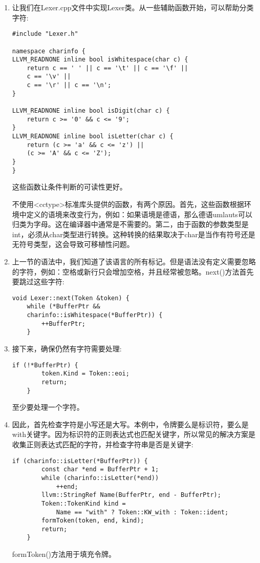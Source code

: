 \begin{enumerate}
\item 让我们在Lexer.cpp文件中实现Lexer类。从一些辅助函数开始，可以帮助分类字符:
\begin{lstlisting}[caption={}]
#include "Lexer.h"

namespace charinfo {
LLVM_READNONE inline bool isWhitespace(char c) {
	return c == ' ' || c == '\t' || c == '\f' ||
	c == '\v' ||
	c == '\r' || c == '\n';
}

LLVM_READNONE inline bool isDigit(char c) {
	return c >= '0' && c <= '9';
}
LLVM_READNONE inline bool isLetter(char c) {
	return (c >= 'a' && c <= 'z') ||
	(c >= 'A' && c <= 'Z');
}
}
\end{lstlisting}
这些函数让条件判断的可读性更好。
\begin{tcolorbox}[colback=blue!5!white,colframe=blue!75!black,title=Note]
不使用<cctype>标准库头提供的函数，有两个原因。首先，这些函数根据环境中定义的语境来改变行为，例如：如果语境是德语，那么德语umlauts可以归类为字母。这在编译器中通常是不需要的。第二，由于函数的参数类型是int，必须从char类型进行转换。这种转换的结果取决于char是当作有符号还是无符号类型，这会导致可移植性问题。
\end{tcolorbox}

\item 上一节的语法中，我们知道了该语言的所有标记。但是语法没有定义需要忽略的字符，例如：空格或新行只会增加空格，并且经常被忽略。next()方法首先要跳过这些字符:
\begin{lstlisting}[caption={}]
void Lexer::next(Token &token) {
	while (*BufferPtr &&
	charinfo::isWhitespace(*BufferPtr)) {
		++BufferPtr;
	}
\end{lstlisting}

\item 接下来，确保仍然有字符需要处理:
\begin{lstlisting}[caption={}]
	if (!*BufferPtr) {
		token.Kind = Token::eoi;
		return;
	}
\end{lstlisting}
至少要处理一个字符。
	
\item 因此，首先检查字符是小写还是大写。本例中，令牌要么是标识符，要么是with关键字。因为标识符的正则表达式也匹配关键字，所以常见的解决方案是收集正则表达式匹配的字符，并检查字符串是否是关键字:
\begin{lstlisting}[caption={}]
	if (charinfo::isLetter(*BufferPtr)) {
		const char *end = BufferPtr + 1;
		while (charinfo::isLetter(*end))
			++end;
		llvm::StringRef Name(BufferPtr, end - BufferPtr);
		Token::TokenKind kind =
			Name == "with" ? Token::KW_with : Token::ident;
		formToken(token, end, kind);
		return;
	}
\end{lstlisting}
formToken()方法用于填充令牌。


\end{enumerate}
